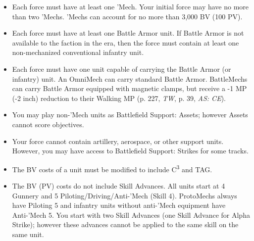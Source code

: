 \begin{itemize}
  \item Each force must have at least one 'Mech.
    Your initial force may have no more than two 'Mechs.
    'Mechs can account for no more than 3,000 BV (100 PV).

  \item Each force must have at least one Battle Armor unit.
    If Battle Armor is not available to the faction in the era, then the force must contain at least one non-mechanized conventional infantry unit.

  \item Each force must have one unit capable of carrying the Battle Armor (or infantry) unit.
    An OmniMech can carry standard Battle Armor.
    BattleMechs can carry Battle Armor equipped with magnetic clamps, but receive a -1 MP (-2 inch) reduction to their Walking MP (p. 227, \emph{TW}, p. 39, \emph{AS: CE}).

  \item You may play non-'Mech units as Battlefield Support: Assets; however Assets cannot score objectives.

  \item Your force cannot contain artillery, aerospace, or other support units.
    However, you may have access to Battlefield Support: Strikes for some tracks.

  \item The BV costs of a unit must be modified to include C\textsuperscript{3} and TAG.

  \item The BV (PV) costs do not include Skill Advances.
    All units start at 4 Gunnery and 5 Piloting/Driving/Anti-'Mech (Skill 4).
    ProtoMechs always have Piloting 5 and infantry units without anti-'Mech equipment have Anti-'Mech 5.
    You start with two Skill Advances (one Skill Advance for Alpha Strike); however these advances cannot be applied to the same skill on the same unit.

\end{itemize}
